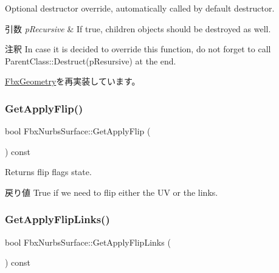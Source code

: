 Optional destructor override, automatically called by default destructor. 
\begin{DoxyParams}{引数}
{\em p\+Recursive} & If true, children objects should be destroyed as well. \\
\hline
\end{DoxyParams}
\begin{DoxyRemark}{注釈}
In case it is decided to override this function, do not forget to call Parent\+Class\+::\+Destruct(p\+Resursive) at the end. 
\end{DoxyRemark}


\hyperlink{class_fbx_geometry_a07e94f7801067d66429afbf1799795cd}{Fbx\+Geometry}を再実装しています。

\mbox{\label{class_fbx_nurbs_surface_a2fb21f20bbdbe07efdfacff8c1a9c746}} 
\subsubsection{\texorpdfstring{Get\+Apply\+Flip()}{GetApplyFlip()}}
{\footnotesize\ttfamily bool Fbx\+Nurbs\+Surface\+::\+Get\+Apply\+Flip (\begin{DoxyParamCaption}{ }\end{DoxyParamCaption}) const}

Returns flip flags state. \begin{DoxyReturn}{戻り値}
{\ttfamily True} if we need to flip either the UV or the links. 
\end{DoxyReturn}
\mbox{\label{class_fbx_nurbs_surface_ad772f72bf7c01a51d7c3976c4247f13d}} 
\subsubsection{\texorpdfstring{Get\+Apply\+Flip\+Links()}{GetApplyFlipLinks()}}
{\footnotesize\ttfamily bool Fbx\+Nurbs\+Surface\+::\+Get\+Apply\+Flip\+Links (\begin{DoxyParamCaption}{ }\end{DoxyParamCaption}) const}


